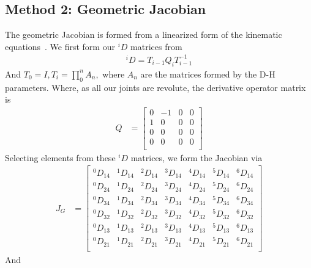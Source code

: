 \documentclass{article}
\begin{document}
\subsection{Method 2: Geometric Jacobian}
The geometric Jacobian is formed from a linearized form of the kinematic equations~\cite{mae225_notes}.
We first form our $^i D$ matrices from
\begin{align*}
^i D = T_{i-1} Q_i T_{i-1}^{-1}
\end{align*}
And $T_{0}= {I}, T_{i} = \prod_0^n A_n,$ where $A_n$ are the matrices formed by the D-H parameters.
Where, as all our joints are revolute, the derivative operator matrix is
\begin{align*}
Q &=
\left[\begin{matrix}
    0 & -1 & 0 & 0 \\
    1 &  0 & 0 & 0 \\
    0 &  0 & 0 & 0 \\
    0 &  0 & 0 & 0 \\
\end{matrix}\right]
\end{align*}
Selecting elements from these $^i D$ matrices, we form the Jacobian via
\begin{align*}
J_G &=
\left[\begin{matrix}
^0D_{14} & ^1D_{14} & ^2D_{14} & ^3D_{14} & ^4D_{14} & ^5D_{14} & ^6D_{14} \\
^0D_{24} & ^1D_{24} & ^2D_{24} & ^3D_{24} & ^4D_{24} & ^5D_{24} & ^6D_{24} \\
^0D_{34} & ^1D_{34} & ^2D_{34} & ^3D_{34} & ^4D_{34} & ^5D_{34} & ^6D_{34} \\
^0D_{32} & ^1D_{32} & ^2D_{32} & ^3D_{32} & ^4D_{32} & ^5D_{32} & ^6D_{32} \\
^0D_{13} & ^1D_{13} & ^2D_{13} & ^3D_{13} & ^4D_{13} & ^5D_{13} & ^6D_{13} \\
^0D_{21} & ^1D_{21} & ^2D_{21} & ^3D_{21} & ^4D_{21} & ^5D_{21} & ^6D_{21} \\
\end{matrix}\right]
\end{align*}
And
\end{document}
